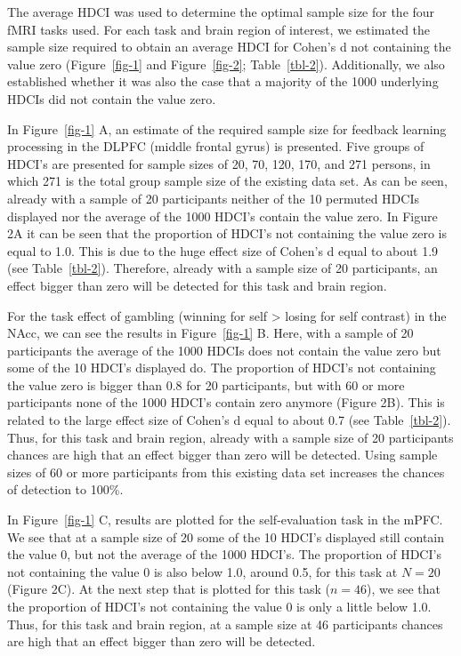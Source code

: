 \documentclass[
  letterpaper,
  DIV=11,
  numbers=noendperiod]{scrartcl}
\begin{document}
The average HDCI was used to determine the optimal sample size for the
four fMRI tasks used. For each task and brain region of interest, we
estimated the sample size required to obtain an average HDCI for Cohen's
d not containing the value zero (Figure~\ref{fig-1} and
Figure~\ref{fig-2}; Table~\ref{tbl-2}). Additionally, we also
established whether it was also the case that a majority of the 1000
underlying HDCIs did not contain the value zero.

In Figure~\ref{fig-1} A, an estimate of the required sample size for
feedback learning processing in the DLPFC (middle frontal gyrus) is
presented. Five groups of HDCI's are presented for sample sizes of 20,
70, 120, 170, and 271 persons, in which 271 is the total group sample
size of the existing data set. As can be seen, already with a sample of
20 participants neither of the 10 permuted HDCIs displayed nor the
average of the 1000 HDCI's contain the value zero. In Figure 2A it can
be seen that the proportion of HDCI's not containing the value zero is
equal to 1.0. This is due to the huge effect size of Cohen's d equal to
about 1.9 (see Table~\ref{tbl-2}). Therefore, already with a sample size
of 20 participants, an effect bigger than zero will be detected for this
task and brain region.

For the task effect of gambling (winning for self \textgreater{} losing
for self contrast) in the NAcc, we can see the results in
Figure~\ref{fig-1} B. Here, with a sample of 20 participants the average
of the 1000 HDCIs does not contain the value zero but some of the 10
HDCI's displayed do. The proportion of HDCI's not containing the value
zero is bigger than 0.8 for 20 participants, but with 60 or more
participants none of the 1000 HDCI's contain zero anymore (Figure 2B).
This is related to the large effect size of Cohen's d equal to about 0.7
(see Table~\ref{tbl-2}). Thus, for this task and brain region, already
with a sample size of 20 participants chances are high that an effect
bigger than zero will be detected. Using sample sizes of 60 or more
participants from this existing data set increases the chances of
detection to 100\%.

In Figure~\ref{fig-1} C, results are plotted for the self-evaluation
task in the mPFC. We see that at a sample size of 20 some of the 10
HDCI's displayed still contain the value 0, but not the average of the
1000 HDCI's. The proportion of HDCI's not containing the value 0 is also
below 1.0, around 0.5, for this task at \(N=20\) (Figure 2C). At the
next step that is plotted for this task (\(n = 46\)), we see that the
proportion of HDCI's not containing the value 0 is only a little below
1.0. Thus, for this task and brain region, at a sample size at 46
participants chances are high that an effect bigger than zero will be
detected.
\end{document}

